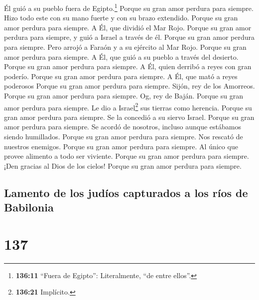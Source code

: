  Él guió a su pueblo fuera de Egipto.\footnote{\textbf{136:11}
  ``Fuera de Egipto'': Literalmente, ``de entre ellos''.} Porque su gran
amor perdura para siempre.  Hizo todo este con su mano
fuerte y con su brazo extendido. Porque su gran amor perdura para
siempre.  A Él, que dividió el Mar Rojo. Porque su gran
amor perdura para siempre,  y guió a Israel a través de
él. Porque su gran amor perdura para siempre.  Pero
arrojó a Faraón y a su ejército al Mar Rojo. Porque su gran amor perdura
para siempre.  A Él, que guió a su pueblo a través del
desierto. Porque su gran amor perdura para siempre.  A
Él, quien derribó a reyes con gran poderío. Porque su gran amor perdura
para siempre.  A Él, que mató a reyes poderosos Porque su
gran amor perdura para siempre.  Sijón, rey de los
Amorreos. Porque su gran amor perdura para siempre.  Og,
rey de Baján. Porque su gran amor perdura para siempre. 
Le dio a Israel\footnote{\textbf{136:21} Implícito.} sus tierras como
herencia. Porque su gran amor perdura para siempre.  Se
la concedió a su siervo Israel. Porque su gran amor perdura para
siempre.  Se acordó de nosotros, incluso aunque estábamos
siendo humillados. Porque su gran amor perdura para siempre.
 Nos rescató de nuestros enemigos. Porque su gran amor
perdura para siempre.  Al único que provee alimento a
todo ser viviente. Porque su gran amor perdura para siempre.
 ¡Den gracias al Dios de los cielos! Porque su gran amor
perdura para siempre.

\hypertarget{lamento-de-los-juduxedos-capturados-a-los-ruxedos-de-babilonia}{%
\subsection{Lamento de los judíos capturados a los ríos de
Babilonia}\label{lamento-de-los-juduxedos-capturados-a-los-ruxedos-de-babilonia}}

\hypertarget{section-136}{%
\section{137}\label{section-136}}

